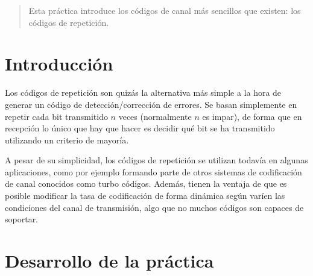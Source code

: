 \documentclass[es,practica]{uah}
\begin{document}

\maketitle

\begin{abstract}
	Esta práctica introduce los códigos de canal más sencillos que existen: los códigos de repetición. 
\end{abstract}

\section{Introducción}

Los códigos de repetición son quizás la alternativa más simple a la hora de generar un código de detección/corrección de errores. Se basan simplemente en repetir cada bit transmitido $n$ veces (normalmente $n$ es impar), de forma que en recepción lo único que hay que hacer es decidir qué bit se ha transmitido utilizando un criterio de mayoría. 

A pesar de su simplicidad, los códigos de repetición se utilizan todavía en algunas aplicaciones, como por ejemplo formando parte de otros sistemas de codificación de canal conocidos como turbo códigos. Además, tienen la ventaja de que es posible modificar la tasa de codificación de forma dinámica según varíen las condiciones del canal de transmisión, algo que no muchos códigos son capaces de soportar. 

\section{Desarrollo de la práctica}
\end{document}
